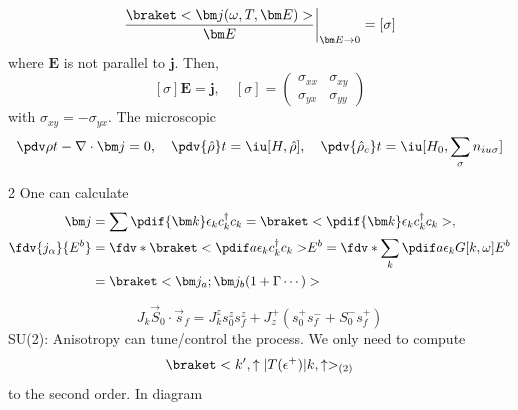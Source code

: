 \[
  \frac{\braket<\bm j(\omega, T, \bm E)>}{\bm E} \bigg|_{\bm E \to 0} = [\sigma]
\]
where $\bm E$ is not parallel to $\bm j$. Then,
\[
  [\sigma] \bm E = \bm j,\quad [\sigma] = \begin{pmatrix}
    \sigma_{xx} & \sigma_{xy}\\
    \sigma_{yx} & \sigma_{yy}
  \end{pmatrix}
\]
with $\sigma_{xy} = -\sigma_{yx}$. The microscopic
\[
  \pdv\rho t - \nabla\cdot \bm j = 0, \quad
  \pdv{\hat \rho}t = \iu[H,\hat \rho], \quad
  \pdv{\hat \rho_c}t = \iu[H_0, \sum_\sigma n_{iu\sigma}]
\]
\begin{paracol}{2}
One can calculate
\begin{align*}
    \bm j & = \sum \pdif{\bm k} \epsilon_k c_k^\dagger c_k
  = \braket<\pdif{\bm k} \epsilon_k c_k^\dagger c_k>, \\
    \fdv{j_\alpha}{E^b} &
  = \fdv*{\braket<\pdif a\epsilon_k c_k^\dagger c_k>}{E^b}
  = \fdv*{\sum_k \pdif a\epsilon_k G[k,\omega]}{E^b}\\
& = \braket<\bm j_a; \bm j_b(1 + \Gamma \cdots)>
\end{align*}
\switchcolumn \centering
{}
\end{paracol}
\[
  J_k \vec S_0 \cdot \vec s_f = J_k^z s_0^z s_f^z
+ J_z^+ (s_0^+s_f^- + S_0^- s_f^+)
\]
SU(2): Anisotropy can tune/control the process. We only need to compute
\[
  \braket<k',\uparrow|T(\epsilon^+)|k,\uparrow>_{(2)}
\]
to the second order. In diagram

